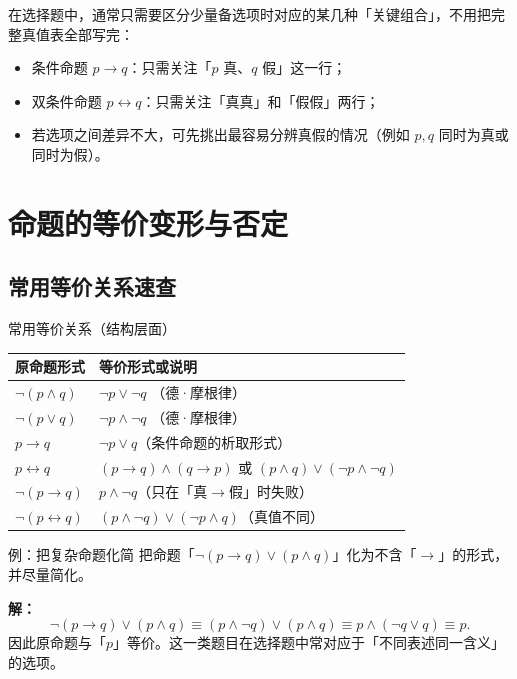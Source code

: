 \documentclass[a4paper,11pt]{ctexart}
\begin{document}
\begin{sideinfobox}[title={刷题建议：真值表只画关键}]
  在选择题中，通常只需要区分少量备选项时对应的某几种「关键组合」，不用把完整真值表全部写完：
  \begin{itemize}
    \item 条件命题 $p\to q$：只需关注「$p$ 真、$q$ 假」这一行；
    \item 双条件命题 $p\leftrightarrow q$：只需关注「真真」和「假假」两行；
    \item 若选项之间差异不大，可先挑出最容易分辨真假的情况（例如 $p,q$ 同时为真或同时为假）。
  \end{itemize}
\end{sideinfobox}

\clearpage
\section{命题的等价变形与否定}

\subsection{常用等价关系速查}

\begin{summarybox}{常用等价关系（结构层面）}
  \begin{center}
  \begin{tabularx}{0.98\textwidth}{>{\raggedright\arraybackslash}p{4.1cm}X}
    \toprule
    \textbf{原命题形式} & \textbf{等价形式或说明} \\
    \midrule
    $\neg(p\land q)$ & $\neg p\lor\neg q$ （德·摩根律） \\
    $\neg(p\lor q)$ & $\neg p\land\neg q$ （德·摩根律） \\
    $p\to q$ & $\neg p\lor q$（条件命题的析取形式） \\
    $p\leftrightarrow q$ & $(p\to q)\land(q\to p)$ 或 $(p\land q)\lor(\neg p\land\neg q)$ \\
    $\neg(p\to q)$ & $p\land\neg q$（只在「真$\to$假」时失败） \\
    $\neg(p\leftrightarrow q)$ & $(p\land\neg q)\lor(\neg p\land q)$（真值不同） \\
    \bottomrule
  \end{tabularx}
  \end{center}
\end{summarybox}

\begin{examplebox}{例：把复杂命题化简}
  把命题「$\neg(p\to q)\lor(p\land q)$」化为不含「$\to$」的形式，并尽量简化。

  \textbf{解：}
  \[
    \neg(p\to q)\lor(p\land q)
    \equiv (p\land\neg q)\lor(p\land q)
    \equiv p\land(\neg q\lor q)
    \equiv p.
  \]
  因此原命题与「$p$」等价。这一类题目在选择题中常对应于「不同表述同一含义」的选项。
\end{examplebox}
\end{document}
